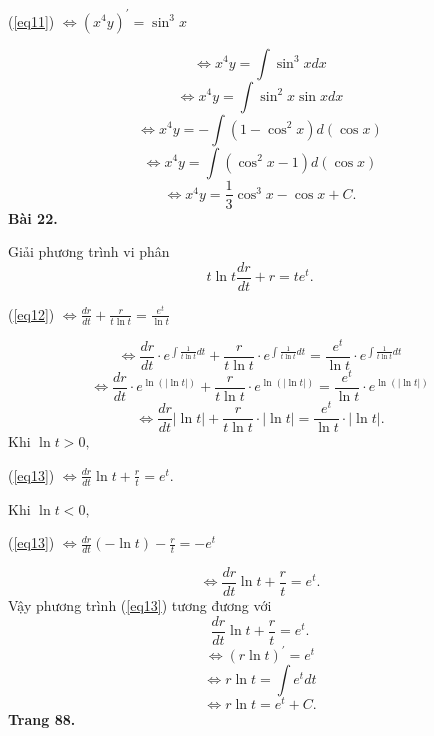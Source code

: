 \documentclass[12pt,a4paper]{article}
\begin{document}
\begin{center}
(\ref{eq11}) \( \Leftrightarrow {\left( {{x^4}y} \right)^\prime } = {\sin ^3}x\)
\end{center}
\[ \Leftrightarrow {x^4}y = \int {{{\sin }^3}xdx} \]
\[ \Leftrightarrow {x^4}y = \int {{{\sin }^2}x\sin xdx} \]
\[ \Leftrightarrow {x^4}y =  - \int {\left( {1 - {{\cos }^2}x} \right)} d\left( {\cos x} \right)\]
\[ \Leftrightarrow {x^4}y = \int {\left( {{{\cos }^2}x - 1} \right)d\left( {\cos x} \right)} \]
\[ \Leftrightarrow {x^4}y = \frac{1}{3}{\cos ^3}x - \cos x + C.\]
\textbf{Bài 22.}
\begin{mybox}
Giải phương trình vi phân
\begin{equation}
t\ln t\frac{{dr}}{{dt}} + r = t{e^t}.
\label{eq12}
\end{equation}
\end{mybox}
\begin{center}
(\ref{eq12}) \( \Leftrightarrow \frac{{dr}}{{dt}} + \frac{r}{{t\ln t}} = \frac{{{e^t}}}{{\ln t}}\)
\end{center}
\[ \Leftrightarrow \frac{{dr}}{{dt}} \cdot {e^{\int {\frac{1}{{t\ln t}}dt} }} + \frac{r}{{t\ln t}} \cdot {e^{\int {\frac{1}{{t\ln t}}dt} }} = \frac{{{e^t}}}{{\ln t}} \cdot {e^{\int {\frac{1}{{t\ln t}}dt} }}\]
\[ \Leftrightarrow \frac{{dr}}{{dt}} \cdot {e^{\ln \left( {\left| {\ln t} \right|} \right)}} + \frac{r}{{t\ln t}} \cdot {e^{\ln \left( {\left| {\ln t} \right|} \right)}} = \frac{{{e^t}}}{{\ln t}} \cdot {e^{\ln \left( {\left| {\ln t} \right|} \right)}}\]
\begin{equation}
\label{eq13}
\Leftrightarrow \frac{{dr}}{{dt}}\left| {\ln t} \right| + \frac{r}{{t\ln t}} \cdot \left| {\ln t} \right| = \frac{{{e^t}}}{{\ln t}} \cdot \left| {\ln t} \right|.
\end{equation}
Khi \(\ln t > 0,\)
\begin{center}
(\ref{eq13}) \( \Leftrightarrow \frac{{dr}}{{dt}}\ln t + \frac{r}{t} = {e^t}.\)
\end{center}
Khi \(\ln t < 0,\)
\begin{center}
(\ref{eq13}) \( \Leftrightarrow \frac{{dr}}{{dt}}\left( { - \ln t} \right) - \frac{r}{t} =  - {e^t}\)
\end{center}
\[ \Leftrightarrow \frac{{dr}}{{dt}}\ln t + \frac{r}{t} = {e^t}.\]
Vậy phương trình (\ref{eq13}) tương đương với
\[\frac{{dr}}{{dt}}\ln t + \frac{r}{t} = {e^t}.\]
\[ \Leftrightarrow {\left( {r\ln t} \right)^\prime } = {e^t}\]
\[ \Leftrightarrow r\ln t = \int {{e^t}dt} \]
\[ \Leftrightarrow r\ln t = {e^t} + C.\]
\textbf{Trang 88.}\\
\end{document}
